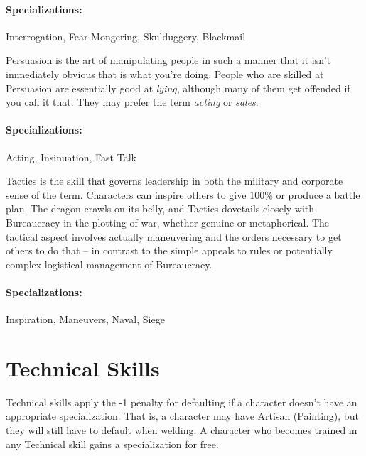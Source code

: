 \paragraph{Specializations:} Interrogation, Fear Mongering, Skulduggery, Blackmail


\hspace{\parindent} Persuasion is the art of manipulating people in such a manner that it isn't immediately obvious that is what you're doing. People who are skilled at Persuasion are essentially good at \textit{lying}, although many of them get offended if you call it that. They may prefer the term \textit{acting} or \textit{sales}.

\paragraph{Specializations:} Acting, Insinuation, Fast Talk


\hspace{\parindent} Tactics is the skill that governs leadership in both the military and corporate sense of the term. Characters can inspire others to give 100\% or produce a battle plan. The dragon crawls on its belly, and Tactics dovetails closely with Bureaucracy in the plotting of war, whether genuine or metaphorical. The tactical aspect involves actually maneuvering and the orders necessary to get others to do that -- in contrast to the simple appeals to rules or potentially complex logistical management of Bureaucracy.

\paragraph{Specializations:} Inspiration, Maneuvers, Naval, Siege

\section{Technical Skills}

\hspace{\parindent} Technical skills apply the -1 penalty for defaulting if a character doesn't have an appropriate specialization. That is, a character may have Artisan (Painting), but they will still have to default when welding. A character who becomes trained in any Technical skill gains a specialization for free.


